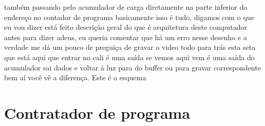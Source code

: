 \documentclass[oneside,11pt]{memoir} %
\begin{document}
também passando pelo acumulador de carga  diretamente na parte inferior do  endereço no contador de programa  basicamente isso é tudo, digamos com  o que eu vou dizer está feito  descrição geral do que é  arquitetura deste computador antes  para dizer adeus, eu queria comentar que há um  erro nesse desenho e a verdade me dá  um pouco de preguiça de gravar o video todo  para trás esta seta que está aqui que  entrar no cali é uma saída se vemos aqui  vem é uma saída do acumulador sai  dados e voltar à luz para  do buffer ou para gravar  correspondente bem aí você vê a  diferença. Este é o esquema



\chapter{Contratador de programa}
\end{document}
